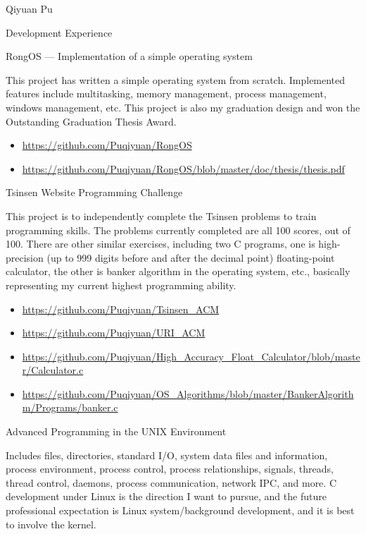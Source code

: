 \documentclass{wx672article} %
\begin{document}
\begin{cv}{Qiyuan Pu}
  \begin{cvlist}{Development Experience}
  \item[RongOS --- Implementation of a simple operating system]\ \par
    This project has written a simple operating system from scratch. Implemented features
    include multitasking, memory management, process management, windows management,
    etc. This project is also my graduation design and won the Outstanding Graduation
    Thesis Award.
    \begin{itemize}
    \item \url{https://github.com/Puqiyuan/RongOS}
    \item \url{https://github.com/Puqiyuan/RongOS/blob/master/doc/thesis/thesis.pdf}
    \end{itemize}
  \item[Tsinsen Website Programming Challenge] \ \par
    This project is to independently complete the Tsinsen problems to train programming
    skills. The problems currently completed are all 100 scores, out of 100. There are
    other similar exercises, including two C programs, one is high-precision (up to 999 digits
    before and after the decimal point) floating-point calculator, the other is banker
    algorithm in the operating system, etc., basically representing my current highest
    programming ability.
    \begin{itemize}
    \item \url{https://github.com/Puqiyuan/Tsinsen_ACM}
    \item \url{https://github.com/Puqiyuan/URI_ACM}
    \item
      \url{https://github.com/Puqiyuan/High_Accuracy_Float_Calculator/blob/master/Calculator.c}
    \item
      \url{https://github.com/Puqiyuan/OS_Algorithms/blob/master/BankerAlgorithm/Programs/banker.c}
    \end{itemize}
  \item[Advanced Programming in the UNIX Environment] \ \par
    Includes files, directories, standard I/O, system data files and information, process
    environment, process control, process relationships, signals, threads, thread control,
    daemons, process communication, network IPC, and more. C development under Linux is
    the direction I want to pursue, and the future professional expectation is Linux
    system/background development, and it is best to involve the kernel.

\end{cvlist}
\end{cv}
\end{document}
